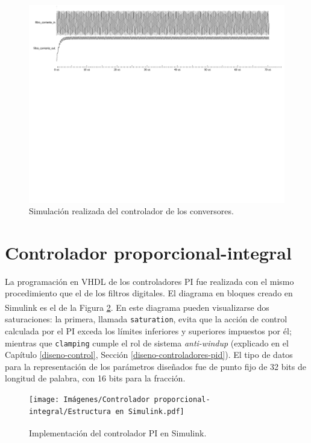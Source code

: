 \begin{figure}[hbt!]
    \centering
    \includegraphics[width=0.85\columnwidth]{Imágenes/Filtro digital/Simulación en ModelSim.pdf}    
    \caption{Simulación realizada del controlador de los conversores.}
    \label{simulacion-filtro}
\end{figure} 

\section{Controlador proporcional-integral}
\label{implementacion-pid}

La programación en VHDL de los controladores PI fue realizada con el mismo procedimiento que el de los filtros digitales. El diagrama en bloques creado en Simulink\textsuperscript\textregistered\hspace{0.05pt} es el de la Figura \ref{estructura-pi}. En este diagrama pueden visualizarse dos saturaciones: la primera, llamada \texttt{saturation}, evita que la acción de control calculada por el PI exceda los límites inferiores y superiores impuestos por él; mientras que \texttt{clamping} cumple el rol de sistema \emph{anti-windup} (explicado en el Capítulo \ref{diseno-control}, Sección \ref{diseno-controladores-pid}). El tipo de datos para la representación de los parámetros diseñados fue de punto fijo de 32 bits de longitud de palabra, con 16 bits para la fracción.

\begin{figure}[hbt!]
    \centering
    \texttt{[image: Imágenes/Controlador proporcional-integral/Estructura en Simulink.pdf]}    
    \caption{Implementación del controlador PI en Simulink\textsuperscript\textregistered.}
    \label{estructura-pi}
\end{figure}

